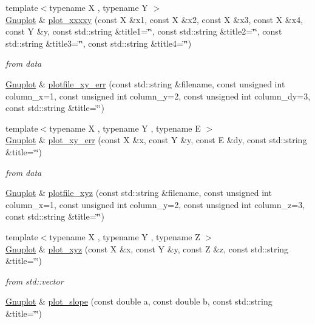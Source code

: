 \begin{DoxyCompactItemize}
\item 
{\footnotesize template$<$typename X , typename Y $>$ }\\\hyperlink{class_gnuplot}{Gnuplot} \& \hyperlink{class_gnuplot_aa4736bcf899c4b2454117f9377a707e3}{plot\-\_\-xxxxy} (const X \&x1, const X \&x2, const X \&x3, const X \&x4, const Y \&y, const std\-::string \&title1=\char`\"{}\char`\"{}, const std\-::string \&title2=\char`\"{}\char`\"{}, const std\-::string \&title3=\char`\"{}\char`\"{}, const std\-::string \&title4=\char`\"{}\char`\"{})
\begin{DoxyCompactList}\small\item\em from data \end{DoxyCompactList}\item 
\hyperlink{class_gnuplot}{Gnuplot} \& \hyperlink{class_gnuplot_afe9d44ba12f617188111ab915010f3ab}{plotfile\-\_\-xy\-\_\-err} (const std\-::string \&filename, const unsigned int column\-\_\-x=1, const unsigned int column\-\_\-y=2, const unsigned int column\-\_\-dy=3, const std\-::string \&title=\char`\"{}\char`\"{})
\item 
{\footnotesize template$<$typename X , typename Y , typename E $>$ }\\\hyperlink{class_gnuplot}{Gnuplot} \& \hyperlink{class_gnuplot_a3c5d382eba33f92b26ba85f201bc7dea}{plot\-\_\-xy\-\_\-err} (const X \&x, const Y \&y, const E \&dy, const std\-::string \&title=\char`\"{}\char`\"{})
\begin{DoxyCompactList}\small\item\em from data \end{DoxyCompactList}\item 
\hyperlink{class_gnuplot}{Gnuplot} \& \hyperlink{class_gnuplot_a9dbde2a91eb816481657f3a22c9b0046}{plotfile\-\_\-xyz} (const std\-::string \&filename, const unsigned int column\-\_\-x=1, const unsigned int column\-\_\-y=2, const unsigned int column\-\_\-z=3, const std\-::string \&title=\char`\"{}\char`\"{})
\item 
\hypertarget{class_gnuplot_af89cb366fa7d09ffc1c351516ae54df5}{{\footnotesize template$<$typename X , typename Y , typename Z $>$ }\\\hyperlink{class_gnuplot}{Gnuplot} \& \hyperlink{class_gnuplot_af89cb366fa7d09ffc1c351516ae54df5}{plot\-\_\-xyz} (const X \&x, const Y \&y, const Z \&z, const std\-::string \&title=\char`\"{}\char`\"{})}\label{class_gnuplot_af89cb366fa7d09ffc1c351516ae54df5}

\begin{DoxyCompactList}\small\item\em from std\-::vector \end{DoxyCompactList}\item 
\hypertarget{class_gnuplot_a51ea5105eb87285820bb93910f8d346c}{\hyperlink{class_gnuplot}{Gnuplot} \& \hyperlink{class_gnuplot_a51ea5105eb87285820bb93910f8d346c}{plot\-\_\-slope} (const double a, const double b, const std\-::string \&title=\char`\"{}\char`\"{})}\label{class_gnuplot_a51ea5105eb87285820bb93910f8d346c}


\end{DoxyCompactItemize}
